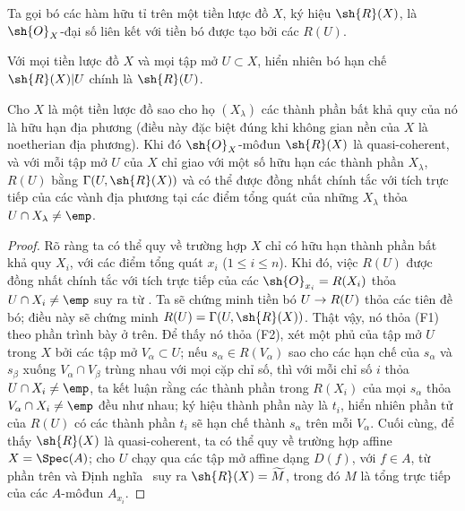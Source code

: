 \documentclass[oneside]{amsart}
\makeatletter
\renewcommand{\leq}{\leqslant}
\newcommand{\ega@arrow}[2]{\mathchoice{#1}{#2}{#2}{#2}}
\renewcommand{\to}{\ega@arrow{\longrightarrow}{\rightarrow}}
\newcommand{\oldpage}[2][]{{\marginnote{\normalfont\textbf{#1}~|~#2}}\ignorespaces}
\let\EGAOriginalLabel\label
\renewcommand{\label}[1]{\phantomsection\EGAOriginalLabel{#1}}
\makeatother
\begin{document}
\oldpage[I]{162}
\begin{definition}[7.3.2]
\label{I.7.3.2}
Ta gọi bó các hàm hữu tỉ trên một tiền lược đồ $X$, ký hiệu $\sh{R}(X)$, là $\sh{O}_X$-đại số liên kết với tiền bó được tạo bởi các $R(U)$.
\end{definition}

Với mọi tiền lược đồ $X$ và mọi tập mở $U\subset X$, hiển nhiên bó hạn chế $\sh{R}(X)|U$ chính là $\sh{R}(U)$.

\begin{proposition}[7.3.3]
\label{I.7.3.3}
Cho $X$ là một tiền lược đồ sao cho họ $(X_\lambda)$ các thành phần bất khả quy của nó là hữu hạn địa phương (điều này đặc biệt đúng khi không gian nền của $X$ là noetherian địa phương).
Khi đó $\sh{O}_X$-môđun $\sh{R}(X)$ là quasi-coherent, và với mỗi tập mở $U$ của $X$ chỉ giao với một số hữu hạn các thành phần $X_\lambda$, $R(U)$ bằng $\Gamma(U,\sh{R}(X))$ và có thể được đồng nhất chính tắc với tích trực tiếp của các vành địa phương tại các điểm tổng quát của những $X_\lambda$ thỏa $U\cap X_\lambda\neq\emp$.
\end{proposition}

\begin{proof}
Rõ ràng ta có thể quy về trường hợp $X$ chỉ có hữu hạn thành phần bất khả quy $X_i$, với các điểm tổng quát $x_i$ ($1\leq i\leq n$).
Khi đó, việc $R(U)$ được đồng nhất chính tắc với tích trực tiếp của các $\sh{O}_{x_i}=R(X_i)$ thỏa $U\cap X_i\neq\emp$ suy ra từ .
Ta sẽ chứng minh tiền bó $U\to R(U)$ thỏa các tiên đề bó; điều này sẽ chứng minh $R(U)=\Gamma(U,\sh{R}(X))$.
Thật vậy, nó thỏa (F1) theo phần trình bày ở trên.
Để thấy nó thỏa (F2), xét một phủ của tập mở $U$ trong $X$ bởi các tập mở $V_\alpha\subset U$; nếu $s_\alpha\in R(V_\alpha)$ sao cho các hạn chế của $s_\alpha$ và $s_\beta$ xuống $V_\alpha\cap V_\beta$ trùng nhau với mọi cặp chỉ số, thì với mỗi chỉ số $i$ thỏa $U\cap X_i\neq\emp$, ta kết luận rằng các thành phần trong $R(X_i)$ của mọi $s_\alpha$ thỏa $V_\alpha\cap X_i\neq\emp$ đều như nhau; ký hiệu thành phần này là $t_i$, hiển nhiên phần tử của $R(U)$ có các thành phần $t_i$ sẽ hạn chế thành $s_\alpha$ trên mỗi $V_\alpha$.
Cuối cùng, để thấy $\sh{R}(X)$ là quasi-coherent, ta có thể quy về trường hợp affine $X=\Spec(A)$; cho $U$ chạy qua các tập mở affine dạng $D(f)$, với $f\in A$, từ phần trên và Định nghĩa~ suy ra $\sh{R}(X)=\widetilde{M}$, trong đó $M$ là tổng trực tiếp của các $A$-môđun $A_{x_i}$.
\end{proof}
\end{document}
